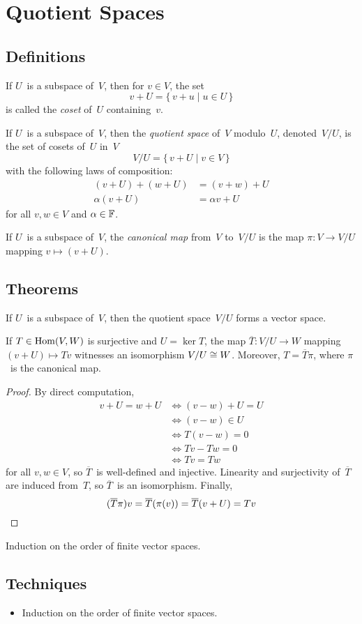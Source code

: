 %
%
%
\section{Quotient Spaces}
\subsection*{Definitions}
\begin{defn}
If \(U\)~is a subspace of~\(V\), then for \(v\in V\), the set
\[v+U=\{\,v+u\mid u\in U\,\}\]
is called the \emph{coset} of~\(U\) containing~\(v\).
\end{defn}
\begin{defn}
If \(U\)~is a subspace of~\(V\), then the \emph{quotient space} of~\(V\) modulo~\(U\), denoted~\(V/U\), is the set of cosets of~\(U\) in~\(V\)
\[V/U=\{\,v+U\mid v\in V\,\}\]
with the following laws of composition:
\begin{align*}
(v+U)+(w+U)&=(v+w)+U\\
\alpha(v+U)&=\alpha v+U
\end{align*}
for all \(v,w\in V\) and \(\alpha\in\mathbb{F}\).
\end{defn}
\begin{defn}
If \(U\)~is a subspace of~\(V\), the \emph{canonical map} from~\(V\) to~\(V/U\) is the map \(\pi:V\to V/U\) mapping \(v\mapsto(v+U)\).
\end{defn}
\subsection*{Theorems}
\begin{thm}
If \(U\)~is a subspace of~\(V\), then the quotient space~\(V/U\) forms a vector space.
\end{thm}

\begin{thm}
If \(T\in\operatorname{Hom}(V,W)\) is surjective and \(U=\ker T\), the map \(\overline{T}:V/U\to W\) mapping \((v+U)\mapsto Tv\) witnesses an isomorphism \(V/U\cong W\). Moreover, \(T=\overline{T}\pi\), where \(\pi\)~is the canonical map.
\end{thm}
\begin{proof}
By direct computation,
\begin{align*}
v+U=w+U&\iff(v-w)+U=U\\
        &\iff(v-w)\in U\\
        &\iff T(v-w)=0\\
        &\iff Tv-Tw=0\\
        &\iff Tv=Tw
\end{align*}
for all \(v,w\in V\), so \(\overline{T}\)~is well-defined and injective. Linearity and surjectivity of~\(\overline{T}\) are induced from~\(T\), so \(\overline{T}\)~is an isomorphism. Finally,
\[(\overline{T}\pi)v=\overline{T}(\pi(v))=\overline{T}(v+U)=Tv\qedhere\]
\end{proof}
\begin{app}
Induction on the order of finite vector spaces.
\end{app}
\subsection*{Techniques}
\begin{itemize}[itemsep=0pt]
\item Induction on the order of finite vector spaces.
\end{itemize}
